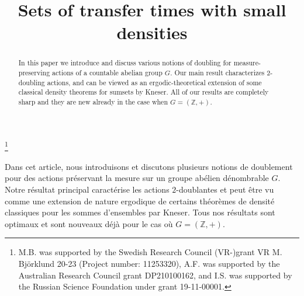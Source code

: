 \documentclass[JEP,XML,SOM,Unicode]{cedram}
\theoremstyle{plain}
\theoremstyle{definition}
\begin{document}
\frontmatter

\title{Sets of transfer times with small densities}

\author[\initial{M.} \lastname{Björklund}]{ }
\address{Department of Mathematics, Chalmers University\\
Chalmers Tvärgata 3, SE-412 96 Gothenburg, Sweden}

\author[\initial{A.} \lastname{Fish}]{ }
\address{The School of Mathematics and Statistics, Faculty of Science, The University of Sydney\\
NSW 2006, Sydney, Australia}

\author[\initial{I.} \middlename {D.} \lastname{Shkredov}]{  }
\address{Steklov Mathematical Institute\\
ul. Gubkina 8, 119991 Moscow, Russia}

\thanks{M.B. was supported by the Swedish Research Council (VR-)grant VR M. Björklund 20-23 (Project number: 11253320), A.F. was supported by the Australian Research Council grant DP210100162, and I.S. was supported by the Russian Science Foundation under grant 19-11-00001.}

\begin{abstract}
In this paper we introduce and discuss various notions of doubling for measure-preserving actions of a countable abelian group $G$. Our main result characterizes $2$\nobreakdash-doubling actions, and can be viewed as an ergodic-theoretical extension of some classical density theorems for sumsets by Kneser. All of our results are completely sharp and they are new already in the case when $G = (\mathbb{Z},+)$.
\end{abstract}





\begin{altabstract}
Dans cet article, nous introduisons et discutons plusieurs notions de doublement pour des actions préservant la mesure sur un groupe abélien dénombrable $G$. Notre résultat principal caractérise les actions $2$-doublantes et peut être vu comme une extension de nature ergodique de certains théorèmes de densité classiques pour les sommes d'ensembles par Kneser. Tous nos résultats sont optimaux et sont nouveaux déjà pour le cas où $G = (\mathbb{Z},+)$.
\end{altabstract}
\maketitle
\vspace*{-1.5\baselineskip}
\tableofcontents
\mainmatter
\end{document}
